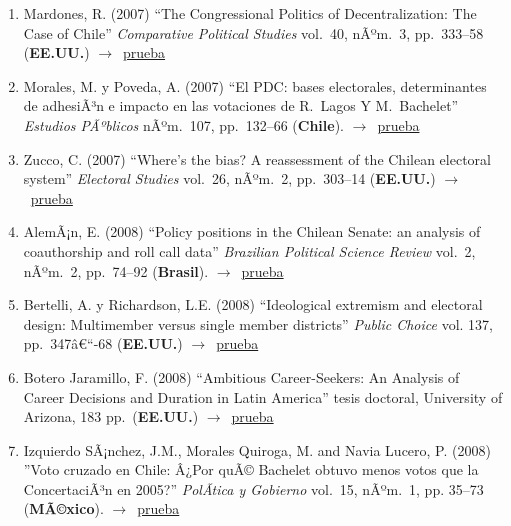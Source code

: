 \documentclass[12 pt, letter]{article}
\newenvironment{CitasMiTrabajo}{
    \begin{footnotesize}
    \begin{enumerate}[label={\footnotesize\emph{cita~\arabic*}},ref=\arabic*] %
        \setlength{\itemsep}{.1\itemsep}
        \setlength{\parskip}{.1\parskip}
    }{\end{enumerate}\end{footnotesize}}
\begin{document}
\begin{CitasMiTrabajo}
        \item Mardones, R. (2007)
        ``The Congressional Politics of Decentralization: The Case of Chile'' \emph{Comparative
        Political Studies} vol.\ 40, nÃºm.\ 3, pp.\ 333--58  (\textbf{EE.UU.}) $\rightarrow$~\href{http://ericmagar.com/cv/cites/mrs/mardones.pdf}{prueba}

        \item Morales, M. y Poveda, A. (2007)
        ``El PDC: bases electorales, determinantes de adhesiÃ³n e impacto en las votaciones de R.\ Lagos Y M.\ Bachelet''
        \emph{Estudios PÃºblicos} nÃºm.\ 107, pp.\ 132--66  (\textbf{Chile}). $\rightarrow$~\href{http://ericmagar.com/cv/cites/mrs/morales+povedapdcbases.pdf}{prueba}

        \item Zucco, C. (2007)
        ``Where's the bias? A reassessment of the Chilean electoral system'' \emph{Electoral Studies} vol.\ 26, nÃºm.\ 2,
        pp.\ 303--14  (\textbf{EE.UU.}) $\rightarrow$~\href{http://ericmagar.com/cv/cites/mrs/zucco.pdf}{prueba}

        \item AlemÃ¡n, E. (2008)
        ``Policy positions in the Chilean Senate: an analysis of coauthorship and roll call data''
        \emph{Brazilian Political Science Review}
        vol.\ 2, nÃºm.\ 2, pp.\ 74--92 (\textbf{Brasil}). $\rightarrow$~\href{http://ericmagar.com/cv/cites/mrs/alemanCosponsorChile2008brjps.excerpt.pdf}{prueba}

        \item Bertelli, A. y Richardson, L.E. (2008)
        ``Ideological extremism and electoral design: Multimember versus
        single member districts'' \emph{Public Choice} vol. 137, pp.\
        347â€“-68  (\textbf{EE.UU.}) $\rightarrow$~\href{http://ericmagar.com/cv/cites/mrs/bertelli.pdf}{prueba}

        \item Botero Jaramillo, F. (2008)
        ``Ambitious Career-Seekers: An Analysis of Career Decisions and Duration in Latin America'' tesis doctoral, University of Arizona, 183 pp.\ (\textbf{EE.UU.}) $\rightarrow$~\href{http://ericmagar.com/cv/cites/mrs/Botero2008.pdf}{prueba}

        \item Izquierdo SÃ¡nchez, J.M., Morales Quiroga, M. and Navia Lucero, P. (2008)
        ''Voto cruzado en Chile: Â¿Por quÃ© Bachelet obtuvo menos votos que la ConcertaciÃ³n en 2005?''
        \emph{PolÃ­tica y Gobierno} vol.\ 15, nÃºm.\ 1, pp. 35--73 (\textbf{MÃ©xico}). $\rightarrow$~\href{http://ericmagar.com/cv/cites/mrs/izquierdoetal2008pyg.pdf}{prueba}


\end{CitasMiTrabajo}
\end{document}
